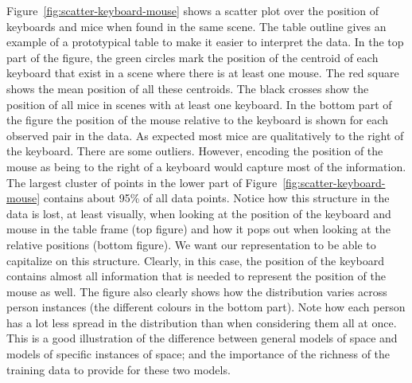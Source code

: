 \documentclass[letterpaper, 10 pt, conference]{ieeeconf}  %
\begin{document}
Figure~\ref{fig:scatter-keyboard-mouse} shows a scatter plot 
over the position of keyboards and mice when found in the same scene. The 
table outline gives an example of a prototypical table to make it easier to 
interpret the data. 
In the top part of the figure, the green circles mark the position of the 
centroid of each 
keyboard that exist in a scene where there is at least one mouse. The red 
square shows the mean position of all these centroids. The black 
crosses show the position of all mice in scenes with at least one keyboard. 
In the bottom part of the figure the position of the mouse 
relative to the keyboard is shown for each observed pair in the data. As 
expected most mice are qualitatively to the right of the keyboard. There are 
some outliers. However,  
encoding the position of the mouse as being to the right of a keyboard would 
capture most of the information. The largest cluster of points in the lower 
part of Figure~\ref{fig:scatter-keyboard-mouse} contains about 95\% 
of all data points. Notice how this structure in the data is lost, at least 
visually, when looking at the position of the keyboard and mouse in the 
table frame (top figure) and how it pops out when looking at the relative 
positions (bottom figure). We want our representation to be able to 
capitalize on this structure. Clearly, in this case, the position of the 
keyboard contains almost all information that is needed to represent the 
position of the mouse as well. The figure also clearly shows how the 
distribution varies across person instances (the different colours in the bottom 
part). Note how each person has a lot less spread in the distribution than 
when considering them all at once. This is a good illustration of the 
difference between general models of space and models of specific instances 
of space; and the importance of the richness of the training data to provide for these two models.
\end{document}
